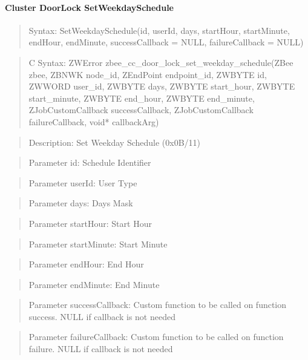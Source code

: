 \paragraph{Cluster DoorLock SetWeekdaySchedule}
\begin{quote}Syntax: SetWeekdaySchedule(id, userId, days, startHour, startMinute, endHour, endMinute, successCallback = NULL, failureCallback = NULL)\end{quote}
\begin{quote}C Syntax: ZWError zbee\_cc\_door\_lock\_set\_weekday\_schedule(ZBee zbee, ZBNWK node\_id, ZEndPoint endpoint\_id, ZWBYTE id, ZWWORD user\_id, ZWBYTE days, ZWBYTE start\_hour, ZWBYTE start\_minute, ZWBYTE end\_hour, ZWBYTE end\_minute, ZJobCustomCallback successCallback, ZJobCustomCallback failureCallback, void* callbackArg)\end{quote}
\begin{quote}Description: Set Weekday Schedule (0x0B/11)\end{quote}
\begin{quote}Parameter id: Schedule Identifier\end{quote}
\begin{quote}Parameter userId: User Type\end{quote}
\begin{quote}Parameter days: Days Mask\end{quote}
\begin{quote}Parameter startHour: Start Hour\end{quote}
\begin{quote}Parameter startMinute: Start Minute\end{quote}
\begin{quote}Parameter endHour: End Hour\end{quote}
\begin{quote}Parameter endMinute: End Minute\end{quote}
\begin{quote}Parameter successCallback: Custom function to be called on function success. NULL if callback is not needed\end{quote}
\begin{quote}Parameter failureCallback: Custom function to be called on function failure. NULL if callback is not needed\end{quote}


